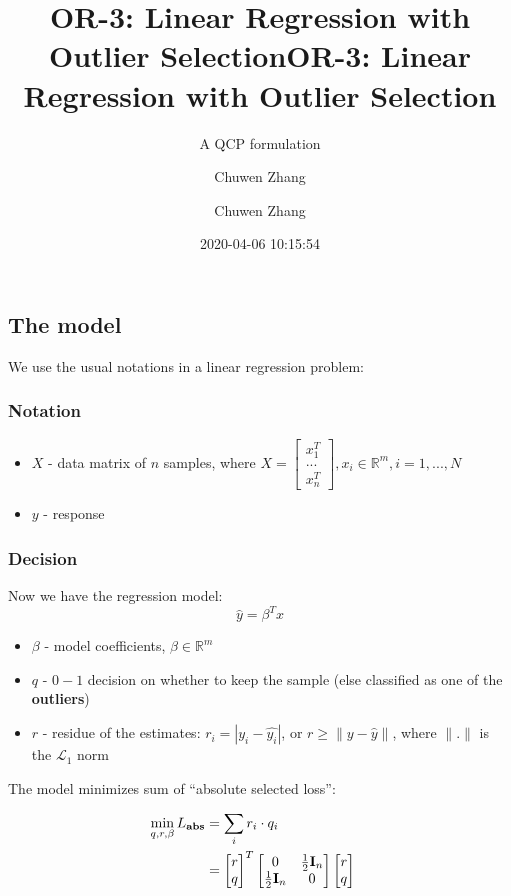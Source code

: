 \documentclass[
  10pt,
  a4paper,
,tablecaptionabove
]{scrartcl}
\title{OR-3: Linear Regression with Outlier Selection}
\subtitle{A QCP formulation}
\author{Chuwen Zhang}
\date{2020-04-06 10:15:54}
\title{OR-3: Linear Regression with Outlier Selection}
\author{Chuwen Zhang}
\providecommand{\tightlist}{%
  \setlength{\itemsep}{0pt}\setlength{\parskip}{0pt}}
\begin{document}




\hypertarget{the-model}{%
\subsection{The model}\label{the-model}}

We use the usual notations in a linear regression problem:

\hypertarget{notation}{%
\subsubsection{Notation}\label{notation}}

\begin{itemize}
\tightlist
\item
  \(X\) - data matrix of \(n\) samples, where
  \(X = \begin{bmatrix}x_1^T\\...\\x_n^T\end{bmatrix}, x_i \in \mathbb{R}^m, i=1,...,N\)
\item
  \(y\) - response
\end{itemize}

\hypertarget{decision}{%
\subsubsection{Decision}\label{decision}}

Now we have the regression model: \[\hat{y} = \beta^Tx\]

\begin{itemize}
\tightlist
\item
  \(\beta\) - model coefficients, \(\beta \in \mathbb{R}^m\)
\item
  \(q\) - \(0-1\) decision on whether to keep the sample (else
  classified as one of the \textbf{outliers})
\item
  \(r\) - residue of the estimates: \(r_i = |y_i - \hat{y_i}|\), or
  \(r \ge \|y-\hat{y}\|\), where \(\|.\|\) is the \(\mathcal{L}_1\) norm
\end{itemize}

The model minimizes sum of ``absolute selected loss'':

\[\begin{aligned}\min_{q,r,\beta} L_{\bf abs} &= \sum_i r_i\cdot q_i \\
 &=\begin{bmatrix} r\\q \end{bmatrix}^T\begin{bmatrix} 0 & \frac{1}{2}\mathbf{I}_n\\  \frac{1}{2}\mathbf{I}_n &0 \end{bmatrix}\begin{bmatrix} r\\q \end{bmatrix} & \end{aligned}\]
\end{document}
